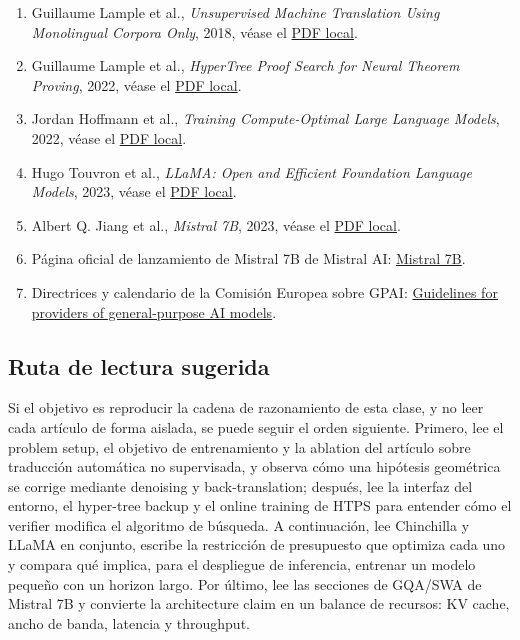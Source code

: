 \begin{enumerate}
  \item Guillaume Lample et al., \emph{Unsupervised Machine Translation Using Monolingual Corpora Only}, 2018, véase el \href{run:source-materials/unsupervised-machine-translation.pdf}{PDF local}.
  \item Guillaume Lample et al., \emph{HyperTree Proof Search for Neural Theorem Proving}, 2022, véase el \href{run:source-materials/hypertree-proof-search.pdf}{PDF local}.
  \item Jordan Hoffmann et al., \emph{Training Compute-Optimal Large Language Models}, 2022, véase el \href{run:source-materials/chinchilla-scaling-laws.pdf}{PDF local}.
  \item Hugo Touvron et al., \emph{LLaMA: Open and Efficient Foundation Language Models}, 2023, véase el \href{run:source-materials/llama.pdf}{PDF local}.
  \item Albert Q. Jiang et al., \emph{Mistral 7B}, 2023, véase el \href{run:source-materials/mistral-7b.pdf}{PDF local}.
  \item Página oficial de lanzamiento de Mistral 7B de Mistral AI: \href{https://mistral.ai/news/announcing-mistral-7b}{Mistral 7B}.
  \item Directrices y calendario de la Comisión Europea sobre GPAI: \href{https://digital-strategy.ec.europa.eu/en/policies/guidelines-gpai-providers}{Guidelines for providers of general-purpose AI models}.
\end{enumerate}

\subsection{Ruta de lectura sugerida}

Si el objetivo es reproducir la cadena de razonamiento de esta clase, y no leer cada artículo de forma aislada, se puede seguir el orden siguiente. Primero, lee el problem setup, el objetivo de entrenamiento y la ablation del artículo sobre traducción automática no supervisada, y observa cómo una hipótesis geométrica se corrige mediante denoising y back-translation; después, lee la interfaz del entorno, el hyper-tree backup y el online training de HTPS para entender cómo el verifier modifica el algoritmo de búsqueda. A continuación, lee Chinchilla y LLaMA en conjunto, escribe la restricción de presupuesto que optimiza cada uno y compara qué implica, para el despliegue de inferencia, entrenar un modelo pequeño con un horizon largo. Por último, lee las secciones de GQA/SWA de Mistral 7B y convierte la architecture claim en un balance de recursos: KV cache, ancho de banda, latencia y throughput.

